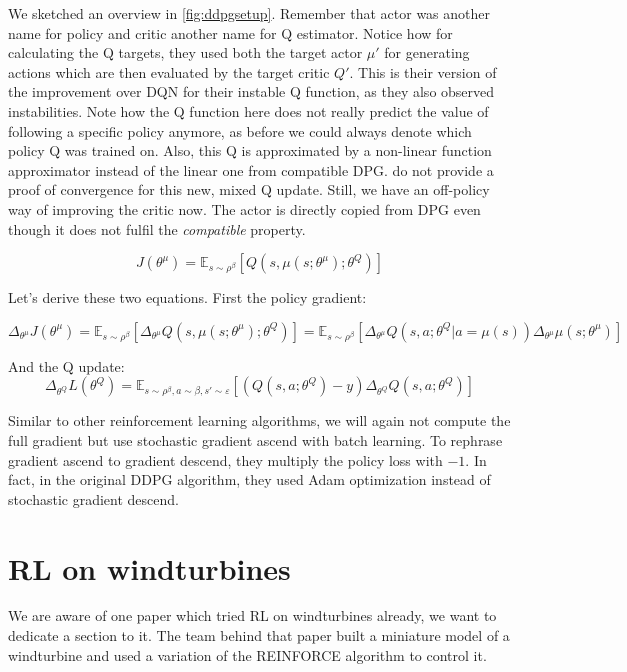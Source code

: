 \documentclass[hyperref,german,beleg]{cgvpub}
\begin{document}
We sketched an overview in \ref{fig:ddpgsetup}. Remember that actor was another name for policy and critic another name for Q estimator. Notice how for calculating the Q targets, they used both the target actor $\mu'$ for generating actions which are then evaluated by the target critic $Q'$. This is their version of the improvement over \ac{DQN} for their instable Q function, as they also observed instabilities. Note how the Q function here does not really predict the value of following a specific policy anymore, as before we could always denote which policy Q was trained on. Also, this Q is approximated by a non-linear function approximator instead of the linear one from compatible \ac{DPG}. \cite{lillicrapCONTINUOUSCONTROLDEEP2015} do not provide a proof of convergence for this new, mixed Q update. Still, we have an off-policy way of improving the critic now. The actor is directly copied from \ac{DPG} even though it does not fulfil the \textit{compatible} property.

\begin{equation}
J(\theta^{\mu}) = \mathbb{E}_{s \sim \rho^{\beta}}[Q(s, \mu(s;\theta^{\mu});\theta^Q)]
\end{equation}

Let's derive these two equations. First the policy gradient:

\begin{equation}
\Delta_{\theta^{\mu}}J(\theta^{\mu}) = \mathbb{E}_{s \sim \rho^{\beta}}[\Delta_{\theta^{\mu}}Q(s, \mu(s;\theta^{\mu});\theta^Q)] = \mathbb{E}_{s \sim \rho^{\beta}}[\Delta_{\theta^{\mu}}Q(s, a;\theta^Q | a=\mu(s)) \Delta_{\theta^{\mu}}\mu(s;\theta^{\mu})]
\end{equation}

And the Q update:
\begin{equation}
\Delta_{\theta^Q} L(\theta^Q) = \mathbb{E}_{s \sim \rho^{\beta}, a \sim \beta, s' \sim \varepsilon}[(Q(s, a;\theta^Q) - y)\Delta_{\theta^Q}Q(s, a;\theta^Q)]
\end{equation}

Similar to other reinforcement learning algorithms, we will again not compute the full gradient but use stochastic gradient ascend with batch learning. To rephrase gradient ascend to gradient descend, they multiply the policy loss with $-1$. In fact, in the original \ac{DDPG} algorithm, they used Adam \cite{kingmaAdamMethodStochastic2017} optimization instead of stochastic gradient descend.




\section{RL on windturbines}
We are aware of one paper \cite{kolterDesignAnalysisLearning2012} which tried RL on windturbines already, we want to dedicate a section to it. The team behind that paper built a miniature model of a windturbine and used a variation of the \ac{REINFORCE} algorithm to control it.
\end{document}

